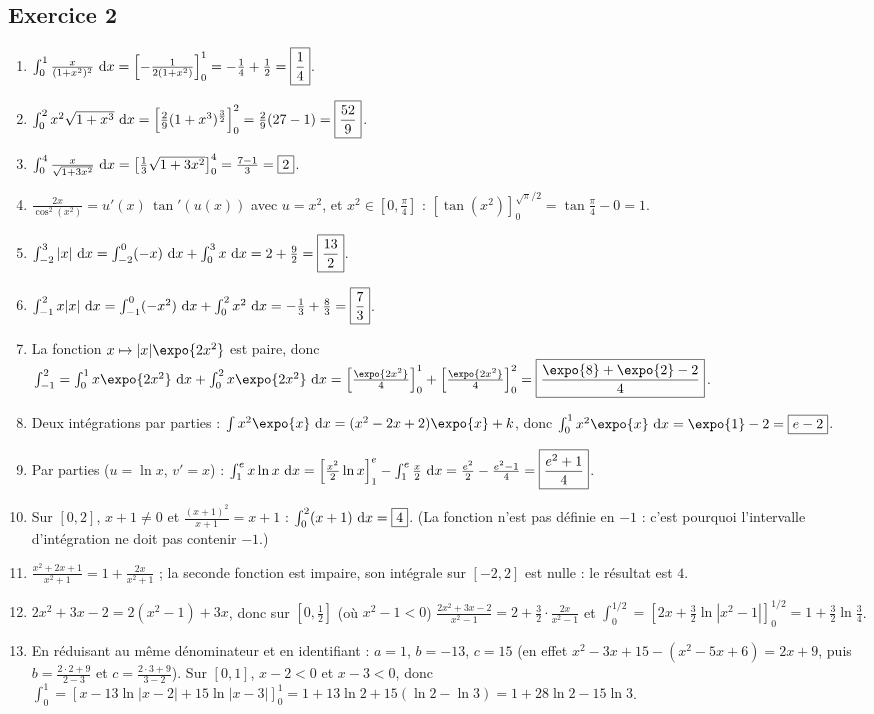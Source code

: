 \begin{corrige}
\subsection*{Exercice 2}
\begin{enumerate}
\item $\int_0^1 \frac{x}{(1+x^2)^2}~\mathrm{d}x = \left[-\frac{1}{2(1+x^2)}\right]_0^1 = -\frac{1}{4} + \frac{1}{2} = \boxed{\frac{1}{4}}$.
\item $\int_0^2 x^2\sqrt{1+x^3}~\mathrm{d}x = \left[\frac{2}{9}(1+x^3)^{\frac{3}{2}}\right]_0^2 = \frac{2}{9}(27-1) = \boxed{\frac{52}{9}}$.
\item $\int_0^4 \frac{x}{\sqrt{1+3x^2}}~\mathrm{d}x = \left[\frac{1}{3}\sqrt{1+3x^2}\right]_0^4 = \frac{7-1}{3} = \boxed{2}$.
\item $\frac{2x}{\cos^2(x^2)} = u'(x)\,\tan'(u(x))$ avec $u = x^2$, et $x^2 \in [0,\frac{\pi}{4}]$ :
      $\left[\tan(x^2)\right]_0^{\sqrt{\pi}/2} = \tan\frac{\pi}{4} - 0 = \boxed{1}$.
\item $\int_{-2}^{3}|x|~\mathrm{d}x = \int_{-2}^0 (-x)~\mathrm{d}x + \int_0^3 x~\mathrm{d}x = 2 + \frac{9}{2} = \boxed{\frac{13}{2}}$.
\item $\int_{-1}^{2}x|x|~\mathrm{d}x = \int_{-1}^0 (-x^2)~\mathrm{d}x + \int_0^2 x^2~\mathrm{d}x = -\frac{1}{3} + \frac{8}{3} = \boxed{\frac{7}{3}}$.
\item La fonction $x\mapsto |x|\expo{2x^2}$ est paire, donc
      $\int_{-1}^{2} = \int_{0}^{1} x\expo{2x^2}\dx + \int_0^2 x\expo{2x^2}\dx
      = \left[\frac{\expo{2x^2}}{4}\right]_0^1 + \left[\frac{\expo{2x^2}}{4}\right]_0^2 = \boxed{\frac{\expo{8} + \expo{2} - 2}{4}}$.
\item Deux int\'egrations par parties : $\int x^2\expo{x}\dx = (x^2 - 2x + 2)\expo{x} + k$, donc
      $\int_0^1 x^2\expo{x}\dx = \expo{1} - 2 = \boxed{e - 2}$.
\item Par parties ($u = \ln x$, $v' = x$) : $\int_1^e x\ln x~\mathrm{d}x = \left[\frac{x^2}{2}\ln x\right]_1^e - \int_1^e\frac{x}{2}~\mathrm{d}x
      = \frac{e^2}{2} - \frac{e^2-1}{4} = \boxed{\frac{e^2+1}{4}}$.
\item Sur $[0,2]$, $x+1 \neq 0$ et $\frac{(x+1)^2}{x+1} = x+1$ : $\int_0^2 (x+1)~\mathrm{d}x = \boxed{4}$.
      (La fonction n'est pas d\'efinie en $-1$ : c'est pourquoi l'intervalle d'int\'egration ne doit pas contenir $-1$.)
\item $\frac{x^2+2x+1}{x^2+1} = 1 + \frac{2x}{x^2+1}$ ; la seconde fonction est impaire, son int\'egrale sur $[-2,2]$ est nulle :
      le r\'esultat est $\boxed{4}$.
\item $2x^2 + 3x - 2 = 2(x^2-1) + 3x$, donc sur $[0,\frac{1}{2}]$ (o\`u $x^2 - 1 < 0$)
      $\frac{2x^2+3x-2}{x^2-1} = 2 + \frac{3}{2}\cdot\frac{2x}{x^2-1}$ et
      $\int_0^{1/2} = \left[2x + \frac{3}{2}\ln|x^2-1|\right]_0^{1/2} = \boxed{1 + \frac{3}{2}\ln\frac{3}{4}}$.
\item En r\'eduisant au m\^eme d\'enominateur et en identifiant : $a = 1$, $b = -13$, $c = 15$
      (en effet $x^2 - 3x + 15 - (x^2 - 5x + 6) = 2x + 9$, puis $b = \frac{2\cdot 2+9}{2-3}$ et $c = \frac{2\cdot 3+9}{3-2}$).
      Sur $[0,1]$, $x - 2 < 0$ et $x - 3 < 0$, donc
      $\int_0^1 = \left[x - 13\ln|x-2| + 15\ln|x-3|\right]_0^1 = 1 + 13\ln 2 + 15(\ln 2 - \ln 3) = \boxed{1 + 28\ln 2 - 15\ln 3}$.
\end{enumerate}


\end{corrige}
